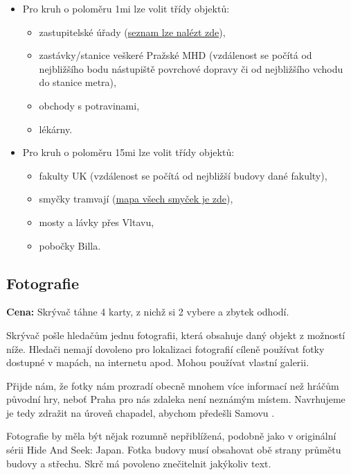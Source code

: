 \begin{itemize}
	\item Pro kruh o poloměru \dist1mi lze volit třídy objektů:
	\begin{itemize}
		\item zastupitelské úřady (\href{https://cs.wikipedia.org/wiki/Seznam_zastupitelsk\%C3\%BDch_\%C3\%BA\%C5\%99ad\%C5\%AF_v_\%C4\%8Cesk\%C3\%A9_republice}{seznam lze nalézt zde}),
		\item zastávky/stanice veškeré Pražské MHD (vzdálenost se počítá od nejbližšího bodu nástupiště povrchové dopravy či od nejbližšího vchodu do stanice metra),
		\item obchody s potravinami,
		\item lékárny.
	\end{itemize}
	\item Pro kruh o poloměru \dist15mi lze volit třídy objektů:
	\begin{itemize}
		\item fakulty UK (vzdálenost se počítá od nejbližší budovy dané fakulty),
		\item smyčky tramvají (\href{https://mapy.com/s/fobosuzuzu}{mapa všech smyček je zde}),
		\item mosty a lávky přes Vltavu,
		\item pobočky Billa.
	\end{itemize}
\end{itemize}

\subsection{Fotografie}

\textbf{Cena:} Skrývač táhne 4 karty, z nichž si 2 vybere a zbytek odhodí.

Skrývač pošle hledačům jednu fotografii, která obsahuje daný objekt z možností níže. Hledači nemají dovoleno pro lokalizaci fotografií cíleně používat fotky dostupné v mapách, na internetu apod. Mohou používat vlastní galerii.

\begin{reasoning}
	Přijde nám, že fotky nám prozradí obecně mnohem více informací než hráčům původní hry, neboť Praha pro nás zdaleka není neznámým místem. Navrhujeme je tedy zdražit na úroveň chapadel, abychom předešli Samovu .
\end{reasoning}

Fotografie by měla být nějak rozumně nepřiblížená, podobně jako v originální sérii Hide And Seek: Japan. Fotka budovy musí obsahovat obě strany průmětu budovy a střechu. Skrč má povoleno znečitelnit jakýkoliv text.

